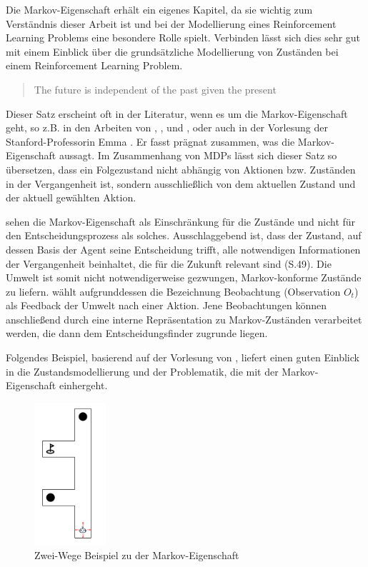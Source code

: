 Die Markov-Eigenschaft erhält ein eigenes Kapitel, da sie wichtig zum Verständnis dieser Arbeit ist und bei der Modellierung eines Reinforcement Learning Problems eine besondere Rolle spielt. Verbinden lässt sich dies sehr gut mit einem Einblick über die grundsätzliche Modellierung von Zuständen bei einem Reinforcement Learning Problem.

\begin{quote}
    The future is independent of the past given the present
  \end{quote}

Dieser Satz erscheint oft in der Literatur, wenn es um die Markov-Eigenschaft geht, so z.B. in den Arbeiten von \cite{Feldman2010}, \cite{kumar2014markov}, \cite{capela2019monogamy} und \cite{SaulMarkov}, oder auch in der Vorlesung der Stanford-Professorin Emma \cite{Brunskill}. Er fasst prägnat zusammen, was die Markov-Eigenschaft aussagt. Im Zusammenhang von MDPs lässt sich dieser Satz so übersetzen, dass ein Folgezustand nicht abhängig von Aktionen bzw. Zuständen in der Vergangenheit ist, sondern ausschließlich von dem aktuellen Zustand und der aktuell gewählten Aktion.
\par 
\cite{Sutton1998} sehen die Markov-Eigenschaft als Einschränkung für die Zustände und nicht für den Entscheidungsprozess als solches. 
Ausschlaggebend ist, dass der Zustand, auf dessen Basis der Agent seine Entscheidung trifft, alle notwendigen Informationen der Vergangenheit beinhaltet, die für die Zukunft relevant sind (S.49).
Die Umwelt ist somit nicht notwendigerweise gezwungen, Markov-konforme Zustände zu liefern. \cite{Brunskill} wählt aufgrunddessen die Bezeichnung \glqq Beobachtung\grqq{} (Observation $O_t$) als Feedback der Umwelt nach einer Aktion. Jene Beobachtungen können anschließend durch eine interne Repräsentation zu Markov-Zuständen verarbeitet werden, die dann dem Entscheidungsfinder zugrunde liegen.
\par
Folgendes Beispiel, basierend auf der Vorlesung von \cite{Brunskill}, liefert einen guten Einblick in die Zustandsmodellierung und der Problematik, die mit der Markov-Eigenschaft einhergeht.
\par 
\begin{figure}[H]
  \centering
  \includegraphics[height=200px]{images/2passagesDefault.png}
  \caption{ Zwei-Wege Beispiel zu der Markov-Eigenschaft}
  \label{fig:2-Wege-1}
\end{figure}

